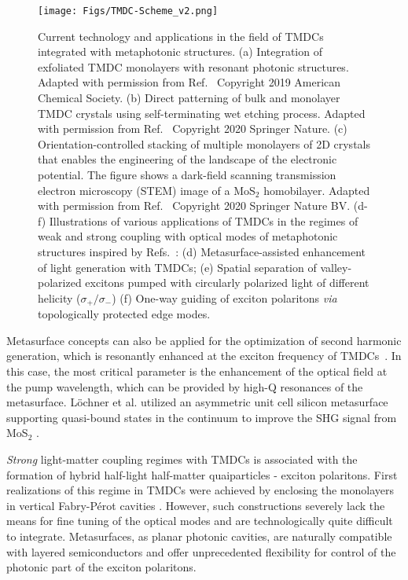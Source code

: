 \documentclass[journal=chreay,manuscript=review]{achemso}
\begin{document}
\begin{figure}
    \centering
    \texttt{[image: Figs/TMDC-Scheme\_v2.png]}
    \caption{
    Current technology and applications in the field of TMDCs integrated with metaphotonic structures. (a) Integration of exfoliated TMDC monolayers with resonant photonic structures. Adapted with permission from Ref.~ Copyright 2019 American Chemical Society. (b) Direct patterning of bulk and monolayer TMDC crystals using self-terminating wet etching process. Adapted with permission from Ref.~ Copyright 2020 Springer Nature. (c) Orientation-controlled stacking of multiple monolayers of 2D crystals that enables the engineering of the landscape of the electronic potential. The figure shows a dark-field scanning transmission electron microscopy (STEM) image of a MoS$_2$ homobilayer. Adapted with permission from Ref.~ Copyright 2020 Springer Nature BV. (d-f) Illustrations of various applications of TMDCs in the regimes of weak and strong coupling with optical modes of metaphotonic structures inspired by Refs.~: (d) Metasurface-assisted enhancement of light generation with TMDCs; (e) Spatial separation of valley-polarized excitons pumped with circularly polarized light of different helicity ($\sigma_+/\sigma_-$) (f) One-way guiding of exciton polaritons \textit{via} topologically protected edge modes.}
    \label{fig:TMDC2scheme}
\end{figure}

Metasurface concepts can also be applied for the optimization of second harmonic generation, which is resonantly enhanced at the exciton frequency of TMDCs~\cite{malard2013observation}. In this case, the most critical parameter is the enhancement of the optical field at the pump wavelength, which can be provided by high-Q resonances of the metasurface. L{\"o}chner et al. utilized an asymmetric unit cell silicon metasurface supporting quasi-bound states in the continuum to improve the SHG signal from MoS$_2$ \cite{loechner2020hybrid}.

\textit{Strong} light-matter coupling regimes with TMDCs is associated with the formation of hybrid half-light half-matter quaiparticles - exciton polaritons. First realizations of this regime in TMDCs were achieved by enclosing the monolayers in vertical Fabry-P{\'e}rot cavities \cite{liu2015strong}. However, such constructions severely lack the means for fine tuning of the optical modes and are technologically quite difficult to integrate. Metasurfaces, as planar photonic cavities, are naturally compatible with layered semiconductors and offer unprecedented flexibility for control of the photonic part of the exciton polaritons. 
\end{document}
